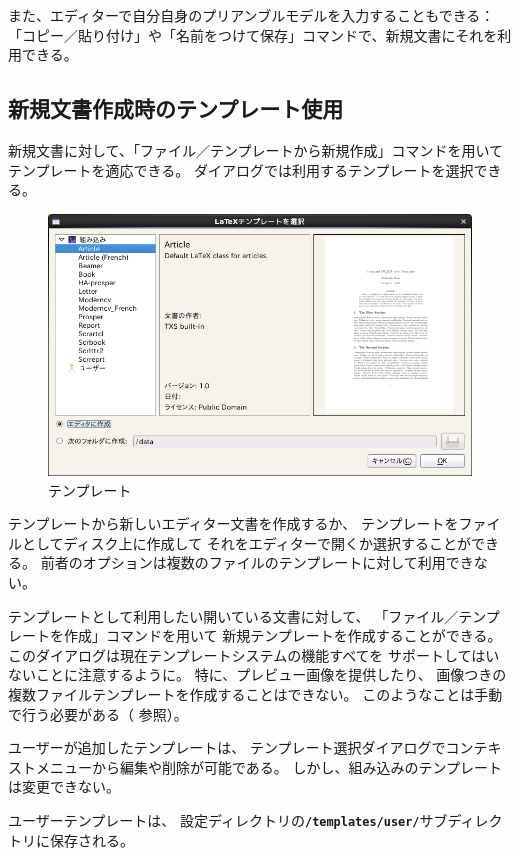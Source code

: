 また、エディターで自分自身のプリアンブルモデルを入力することもできる：
「コピー／貼り付け」や「名前をつけて保存」コマンドで、新規文書にそれを利用できる。

\subsection{新規文書作成時のテンプレート使用}

新規文書に対して、「ファイル／テンプレートから新規作成」コマンドを用いて
テンプレートを適応できる。
ダイアログでは利用するテンプレートを選択できる。

\begin{figure}[H]
  \centering
  \includegraphics[width=.8\linewidth]{template.png}
  \caption{テンプレート}
\end{figure}

テンプレートから新しいエディター文書を作成するか、
テンプレートをファイルとしてディスク上に作成して
それをエディターで開くか選択することができる。
前者のオプションは複数のファイルのテンプレートに対して利用できない。

テンプレートとして利用したい開いている文書に対して、
「ファイル／テンプレートを作成」コマンドを用いて
新規テンプレートを作成することができる。
このダイアログは現在テンプレートシステムの機能すべてを
サポートしてはいないことに注意するように。
特に、プレビュー画像を提供したり、
画像つきの複数ファイルテンプレートを作成することはできない。
このようなことは手動で行う必要がある（
参照）。

ユーザーが追加したテンプレートは、
テンプレート選択ダイアログでコンテキストメニューから編集や削除が可能である。
しかし、組み込みのテンプレートは変更できない。

ユーザーテンプレートは、
設定ディレクトリの\textbf{\texttt{/templates/user/}}サブディレクトリに保存される。

